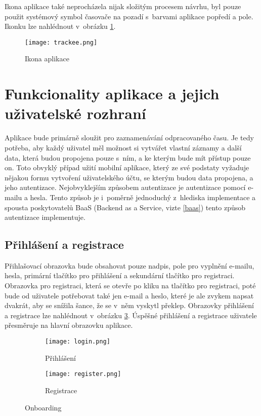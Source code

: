 Ikona aplikace také neprocházela nijak složitým procesem návrhu, byl pouze použit systémový symbol časovače na pozadí s~barvami aplikace popředí a pole. Ikonku lze nahlédnout v~obrázku \ref{fig:app-icon}.

\begin{figure}[h]
	\centering
	\texttt{[image: trackee.png]}
	\caption{Ikona aplikace}
	\label{fig:app-icon}
\end{figure}

\section{Funkcionality aplikace a jejich uživatelské rozhraní}

Aplikace bude primárně sloužit pro zaznamenávání odpracovaného času. Je tedy potřeba, aby každý uživatel měl možnost si vytvářet vlastní záznamy a další data, která budou propojena pouze s~ním, a ke kterým bude mít přístup pouze on. Toto obvyklý případ užití mobilní aplikace, který ze své podstaty vyžaduje nějakou formu vytvoření uživatelského účtu, se kterým budou data propojena, a jeho autentizace. Nejobvyklejším způsobem autentizace je autentizace pomocí e-mailu a hesla. Tento způsob je i~poměrně jednoduchý z~hlediska implementace a spousta poskytovatelů BaaS (Backend as a Service, vizte \ref{baas}) tento způsob autentizace implementuje. 

\subsection{Přihlášení a registrace}

Přihlašovací obrazovka bude obsahovat pouze nadpis, pole pro vyplnění e-mailu, hesla, primární tlačítko pro přihlášení a sekundární tlačítko pro registraci. Obrazovka pro registraci, která se otevře po kliku na tlačítko pro registraci, poté bude od uživatele potřebovat také jen e-mail a heslo, které je ale zvykem napsat dvakrát, aby se snížila šance, že se v~něm vyskytl překlep. Obrazovky přihlášení a registrace lze nahlédnout v~obrázku \ref{fig:onboarding}. Úspěšné přihlášení a registrace uživatele přesměruje na hlavní obrazovku aplikace.

\begin{figure}[h]
    \centering
    \begin{subfigure}[b]{0.4\textwidth}
		\centering
		\texttt{[image: login.png]}
		\caption{Přihlášení}
		\label{fig:login}
	\end{subfigure}
	\hspace{2cm}
	\begin{subfigure}[b]{0.4\textwidth}
		\centering
		\texttt{[image: register.png]}
		\caption{Registrace}
	\end{subfigure}
	\caption{Onboarding}
	\label{fig:onboarding}
\end{figure}

